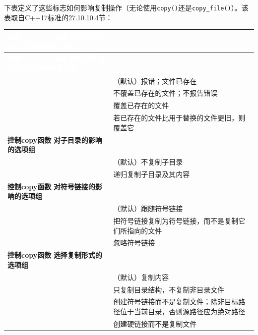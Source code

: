 
下表定义了这些标志如何影响复制操作（无论使用\texttt{copy()}还是\texttt{copy\_\allowbreak{}file()}）。该表取自C++17标准的27.10.10.4节：



\myTableBegin
\begin{xltabular}{\textwidth}{|>{\hsize\raggedright\arraybackslash}X|>{\hsize\raggedright\arraybackslash}X|}
\hline
{} \textcolor{white}{\textbf{控制copy\_file函数} \textbf{对已存在目标文件的影响的选项组}} & \textcolor{white}{} \\
\hline
\endfirsthead
{} \textcolor{white}{\textbf{控制copy\_file函数} \textbf{对已存在目标文件的影响的选项组}} & \textcolor{white}{} \\
\hline
\endhead
{} & （默认）报错；文件已存在\\
\hline
{} & 不覆盖已存在的文件；不报告错误\\
\hline
{} & 覆盖已存在的文件\\
\hline
{} & 若已存在的文件比用于替换的文件更旧，则覆盖它\\
\hline
\textbf{控制copy函数} \textbf{对子目录的影响的选项组} &  \\
\hline
{} & （默认）不复制子目录\\
\hline
{} & 递归复制子目录及其内容\\
\hline
\textbf{控制copy函数} \textbf{对符号链接的影响的选项组} &  \\
\hline
{} & （默认）跟随符号链接\\
\hline
{} & 把符号链接复制为符号链接，而不是复制它们所指向的文件\\
\hline
{} & 忽略符号链接\\
\hline
\textbf{控制copy函数} \textbf{选择复制形式的选项组} &  \\
\hline
{} & （默认）复制内容\\
\hline
{} & 只复制目录结构，不复制非目录文件\\
\hline
{} & 创建符号链接而不是复制文件；除非目标路径位于当前目录，否则源路径应为绝对路径\\
\hline
{} & 创建硬链接而不是复制文件\\
\hline
\end{xltabular}
\myTableEnd


